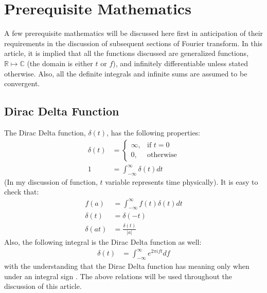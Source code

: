 \documentclass[letterpaper, 11pt]{article}
\newcommand{\fint}{\int_{-\infty}^{\infty}} %
\newcommand{\ift}[3]{\fint #2 e^{2\pi i#1#3} d#1} %
\numberwithin{equation}{section}
\numberwithin{figure}{section}
\numberwithin{table}{section}
\begin{document}
\pagestyle{fancy}

\section{Prerequisite Mathematics}
A few prerequisite mathematics will be discussed here first in anticipation of their requirements in the discussion of subsequent sections of Fourier transform. In this article, it is implied that all the functions discussed are generalized functions, \(\mathbb{R} \mapsto \mathbb{C} \) (the domain is either \(t\) or \(f\)), and infinitely differentiable unless stated otherwise. Also, all the definite integrals and infinite sums are assumed to be convergent.  

\subsection{Dirac Delta Function}
The Dirac Delta function, \(\delta (t)\), has the following properties:
\begin{align}
	\delta (t)	&=\begin{cases}
		\infty, & \text{if } t = 0 \\
		0,	& \text{otherwise}
	\end{cases}\\
		1	&= \fint \delta (t) dt
\end{align}
(In my discussion of function, \(t\) variable represents time physically). It is easy to check that:
\begin{align}
	f(a)		&= \fint f(t) \delta (t) dt\\
	\delta (t)	&= \delta (-t)\\
	\delta (at)	&= \frac{\delta (t)}{|a|}
\end{align}
Also, the following integral is the Dirac Delta function as well:
\begin{align}
	\delta (t)	&= \ift{f}{}{t}
	\label{eq:dirac}
\end{align}
with the understanding that the Dirac Delta function has meaning only when under an integral sign \cite{arfken}. The above relations will be used throughout the discussion of this article.

\end{document}
